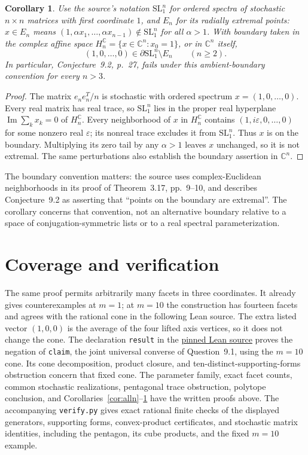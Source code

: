 \documentclass[11pt,a4paper]{article}
\newtheorem{corollary}[theorem]{Corollary}
\newcommand{\C}{\mathbb C}
\begin{document}
\begin{corollary}\label{cor:boundary}
Use the source's notation $\mathrm{SL}_1^n$ for ordered spectra of
stochastic $n\times n$ matrices with first coordinate $1$, and $E_n$ for
its radially extremal points: $x\in E_n$ means
$(1,\alpha x_1,\ldots,\alpha x_{n-1})\notin\mathrm{SL}_1^n$ for all
$\alpha>1$.
With boundary taken in the complex affine space
$H_n^{\C}=\{x\in\C^n:x_0=1\}$, or in $\C^n$ itself,
\[
 (1,0,\ldots,0)\in\partial\mathrm{SL}_1^n\setminus E_n
 \qquad(n\geq2).
\]
In particular, Conjecture~9.2, p.~27, fails under this ambient-boundary
convention for every $n>3$.
\end{corollary}
\begin{proof}
The matrix $e_ne_n^T/n$ is stochastic with ordered spectrum
$x=(1,0,\ldots,0)$.
Every real matrix has real trace, so $\mathrm{SL}_1^n$ lies in the
proper real hyperplane $\operatorname{Im}\sum_kx_k=0$ of $H_n^{\C}$.
Every neighborhood of $x$ in $H_n^{\C}$ contains
$(1,i\varepsilon,0,\ldots,0)$ for some nonzero real $\varepsilon$;
its nonreal trace excludes it from $\mathrm{SL}_1^n$.
Thus $x$ is on the boundary. Multiplying its zero tail by any $\alpha>1$
leaves $x$ unchanged, so it is not extremal. The same perturbations
also establish the boundary assertion in $\C^n$.
\end{proof}
The boundary convention matters: the source uses complex-Euclidean
neighborhoods in its proof of Theorem~3.17, pp.~9--10, and describes
Conjecture~9.2 as asserting that ``points on the boundary are extremal''.
The corollary concerns that convention, not an alternative boundary
relative to a space of conjugation-symmetric lists or to a real spectral
parameterization.

\section{Coverage and verification}
The same proof permits arbitrarily many facets in three coordinates. It
already gives counterexamples at $m=1$; at $m=10$ the construction has
fourteen facets and agrees with the rational cone in the following Lean source.
The extra listed vector $(1,0,0)$ is the average of the four lifted axis
vertices, so it does not change the cone.
The declaration \texttt{result} in the
\href{https://github.com/the-omega-institute/trureturing/blob/e277c80d045570daf43bd03b4e313f7ce457b4e2/D5/S0/FiniteGeometry/Polytopes/JohnsonPaparellaHadamardPolyhedraRefutation.lean}{pinned Lean source}
proves the negation of \texttt{claim}, the joint universal converse of
Question~9.1, using the $m=10$ cone. Its cone decomposition, product closure,
and ten-distinct-supporting-forms obstruction concern that fixed cone.
The parameter family, exact facet counts, common stochastic realizations,
pentagonal trace obstruction, polytope conclusion, and
Corollaries~\ref{cor:alln}--\ref{cor:boundary} have the written proofs above.
The accompanying \texttt{verify.py} gives exact rational finite checks of
the displayed generators, supporting forms, convex-product certificates,
and stochastic matrix identities, including the pentagon, its cube products,
and the fixed $m=10$ example.
\end{document}
